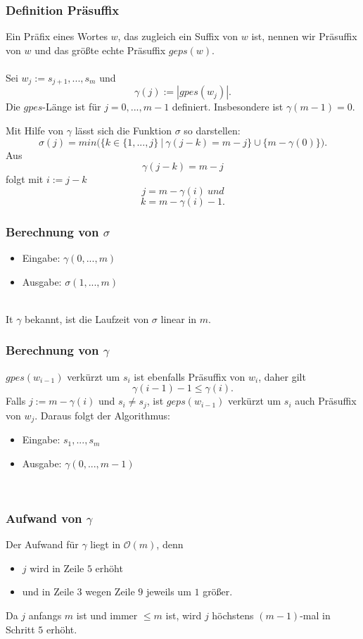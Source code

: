 \subsubsection{Definition Präsuffix}
Ein Präfix eines Wortes \(w\), das zugleich ein Suffix von \(w\) ist, nennen wir Präsuffix von \(w\) und das größte echte Präsuffix \(geps(w)\).
\\\\
Sei \(w_j := s_{j+1},...,s_m\) und
\[\gamma(j) := |gpes(w_j)|.\]
Die \(gpes\)-Länge ist für \(j=0,...,m-1\) definiert. Insbesondere ist \(\gamma(m-1)=0\).

Mit Hilfe von \(\gamma\) lässt sich die Funktion \(\sigma\) so darstellen:
\[\sigma(j) = min\Big( \{k\in \{1,...,j\} ~|~\gamma(j-k) = m-j\} \cup \{m-\gamma(0)\}\Big).\]
Aus
\[\gamma(j-k) = m-j\]
folgt mit \(i := j-k\)
\[j = m-\gamma(i)~und\]
\[k = m-\gamma(i)-1.\]

\subsubsection{Berechnung von \(\sigma\)}
\begin{itemize}
	\item Eingabe: \(\gamma(0,...,m)\)
	\item Ausgabe: \(\sigma(1,...,m)\)
\end{itemize}

\text{}\\

It \(\gamma\) bekannt, ist die Laufzeit von \(\sigma\) linear in \(m\).

\subsubsection{Berechnung von \(\gamma\)}
\(gpes(w_{i-1})\) verkürzt um \(s_i\) ist ebenfalls Präsuffix von \(w_i\), daher gilt
\[\gamma(i-1) -1 \leq \gamma(i).\]
Falls \(j := m-\gamma(i)\) und \(s_i \ne s_j\), ist \(geps(w_{i-1})\) verkürzt um \(s_i\) auch Präsuffix von \(w_j\). Daraus folgt der Algorithmus:
\begin{itemize}
	\item Eingabe: \(s_1,...,s_m\)
	\item Ausgabe: \(\gamma(0,...,m-1)\)
\end{itemize}

\text{}\\


\subsubsection{Aufwand von \(\gamma\)}
Der Aufwand für \(\gamma\) liegt in \(\mathcal{O}(m)\), denn
\begin{itemize}
	\item \(j\) wird in Zeile \(5\) erhöht
	\item und in Zeile \(3\) wegen Zeile \(9\) jeweils um \(1\) größer.
\end{itemize}
Da \(j\) anfangs \(m\) ist und immer \(\leq m\) ist, wird \(j\) höchstens \((m-1)\)-mal in Schritt \(5\) erhöht.

